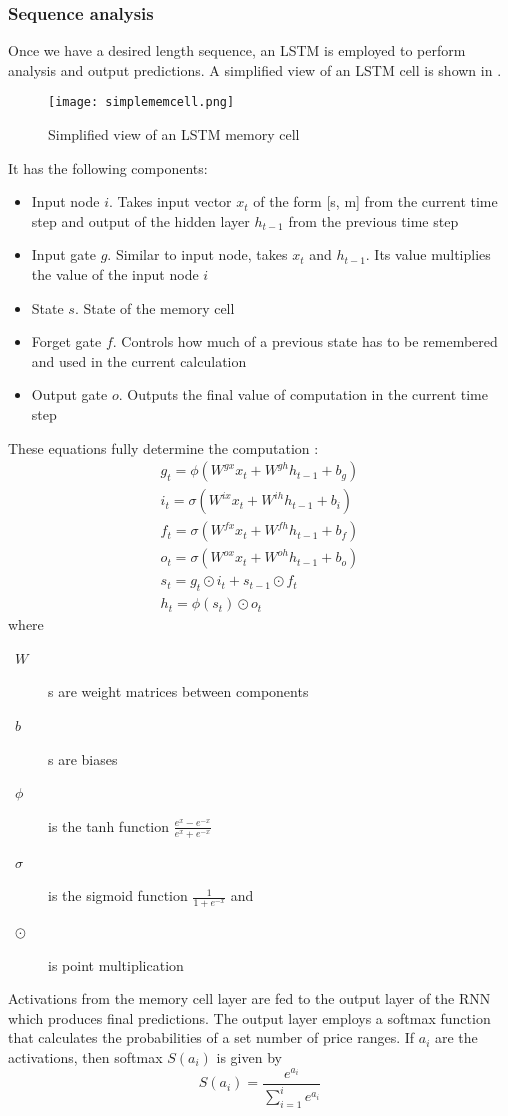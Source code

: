 \documentclass[a4paper]{article}
\begin{document}
\subsubsection{Sequence analysis}
Once we have a desired length sequence, an LSTM is employed to perform analysis and output predictions. A simplified view of an LSTM cell is shown in  \cite{DeepLearningDotNet}. 
\begin{figure}[h!] \centering
	\texttt{[image: simplememcell.png]}
	\caption{Simplified view of an LSTM memory cell} \label{fig:simplememcell}
\end{figure} 
It has the following components:
\begin{itemize}
	\item Input node $i$. Takes input vector $x_t$ of the form [s, m] from the current time step and output of the hidden layer $h_{t-1}$ from the previous time step
	\item Input gate $g$. Similar to input node, takes $x_t$ and $h_{t-1}$. Its value multiplies the value of the input node $i$
	\item State $s$. State of the memory cell
	\item Forget gate $f$. Controls how much of a previous state has to be remembered and used in the current calculation
	\item Output gate $o$. Outputs the final value of computation in the current time step
\end{itemize}
These equations fully determine the computation \cite{RNNReview}:
\begin{gather*}
g_t=\phi(W^{gx}x_t + W^{gh}h_{t-1} + b_g) \\
i_t=\sigma(W^{ix}x_t + W^{ih}h_{t-1} + b_i) \\
f_t=\sigma(W^{fx}x_t + W^{fh}h_{t-1} + b_f) \\
o_t=\sigma(W^{ox}x_t + W^{oh}h_{t-1} + b_o) \\
s_t=g_t \odot i_t + s_{t-1} \odot f_t \\
h_t=\phi(s_t) \odot o_t
\end{gather*}
where
\begin{description}
	\item[~$W$]s are weight matrices between components
	\item[~$b$]s are biases
	\item[~$\phi$] is the tanh function $\frac{e^x - e^{-x}}{e^x + e^{-x}}$
	\item[~$\sigma$] is the sigmoid function $\frac{1}{1 + e^{-x}}$ and
	\item[~$\odot$] is point multiplication
\end{description}
Activations from the memory cell layer are fed to the output layer of the RNN which produces final predictions. The output layer employs a softmax function that calculates the probabilities of a set number of price ranges. If $a_i$ are the activations, then softmax $S(a_i)$ is given by
\begin{displaymath}
S(a_i)=\frac{e^{a_i}}{\sum_{i=1}^i e^{a_i}}
\end{displaymath}
\end{document}
